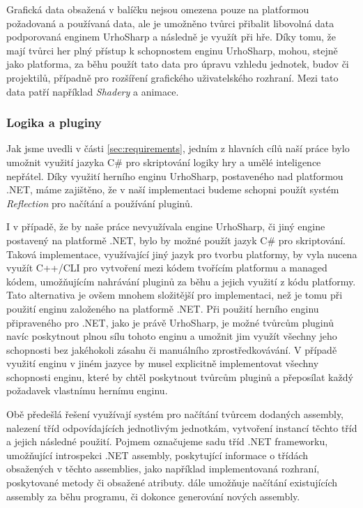Grafická data obsažená v balíčku nejsou omezena pouze na platformou požadovaná a používaná data, ale je umožněno tvůrci přibalit libovolná data podporovaná enginem UrhoSharp a následně je využít při hře. Díky tomu, že mají tvůrci her plný přístup k schopnostem enginu UrhoSharp, mohou, stejně jako platforma, za běhu použít tato data pro úpravu vzhledu jednotek, budov či projektilů, případně pro rozšíření grafického uživatelského rozhraní. Mezi tato data patří například \textit{Shadery} a animace.

\subsubsection{Logika a pluginy}
\label{sec:logicandplugins}
Jak jsme uvedli v části \ref{sec:requirements}, jedním z hlavních cílů naší práce bylo umožnit využití jazyka C\# pro skriptování logiky hry a umělé inteligence nepřátel. Díky využití herního enginu UrhoSharp, postaveného nad platformou .NET, máme zajištěno, že v naší implementaci budeme schopni použít systém \textit{Reflection} pro načítání a používání pluginů. 

I v případě, že by naše práce nevyužívala engine UrhoSharp, či jiný engine postavený na platformě .NET, bylo by možné použít jazyk C\# pro skriptování. Taková implementace, využívající jiný jazyk pro tvorbu platformy, by vyla nucena využít C++/CLI pro vytvoření   mezi kódem tvořícím platformu a managed kódem, umožňujícím nahrávání pluginů za běhu a jejich využití z kódu platformy. Tato alternativa je ovšem mnohem složitější pro implementaci, než je tomu při použití enginu založeného na platformě .NET. Při použití herního enginu připraveného pro .NET, jako je právě UrhoSharp, je možné tvůrcům pluginů navíc poskytnout plnou sílu tohoto enginu a umožnit jim využít všechny jeho schopnosti bez jakéhokoli zásahu či manuálního zprostředkovávání. V případě využití enginu v jiném jazyce by musel   explicitně implementovat všechny schopnosti enginu, které by chtěl poskytnout tvůrcům pluginů a přeposílat každý požadavek vlastnímu hernímu enginu.

Obě předešlá řešení využívají systém   pro načítání tvůrcem dodaných assembly, nalezení tříd odpovídajících jednotlivým jednotkám, vytvoření instancí těchto tříd a jejich následné použití. Pojmem   označujeme sadu tříd .NET frameworku, umožňující introspekci .NET assembly, poskytující informace o třídách obsažených v těchto assemblies, jako například implementovaná rozhraní, poskytované metody či obsažené atributy.   dále umožňuje načítání existujících assembly za běhu programu, či dokonce generování nových assembly. 

